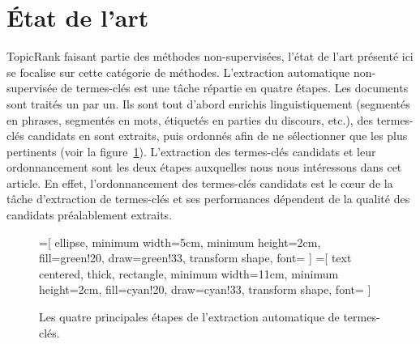\section{État de l'art}
\label{sec:etat_de_l_art}
  TopicRank faisant partie des méthodes non-supervisées, l'état de l'art
  présenté ici se focalise sur cette catégorie de méthodes.
  L'extraction automatique non-supervisée de termes-clés est une tâche répartie
  en quatre étapes. Les documents sont traités un par un. Ils sont tout d'abord
  enrichis linguistiquement (segmentés en phrases, segmentés en mots, étiquetés
  en parties du discours, etc.), des termes-clés candidats en sont extraits,
  puis ordonnés afin de ne sélectionner que les plus pertinents (voir la
  figure~\ref{fig:etapes_de_l_extraction_de_termes_cles}). L'extraction des
  termes-clés candidats et leur ordonnancement sont les deux étapes auxquelles
  nous nous intéressons dans cet article. En effet, l'ordonnancement des
  termes-clés candidats est le c\oe{}ur de la tâche d'extraction de termes-clés
  et ses performances dépendent de la qualité des candidats préalablement
  extraits.
  \begin{figure}
    =[
      ellipse,
      minimum width=5cm,
      minimum height=2cm,
      fill=green!20,
      draw=green!33,
      transform shape,
      font={\huge}
    ]
    =[
      text centered,
      thick,
      rectangle,
      minimum width=11cm,
      minimum height=2cm,
      fill=cyan!20,
      draw=cyan!33,
      transform shape,
      font={\huge\bfseries}
    ]

    \centering
    \caption{Les quatre principales étapes de l'extraction automatique de
             termes-clés. \label{fig:etapes_de_l_extraction_de_termes_cles}}
  \end{figure}

